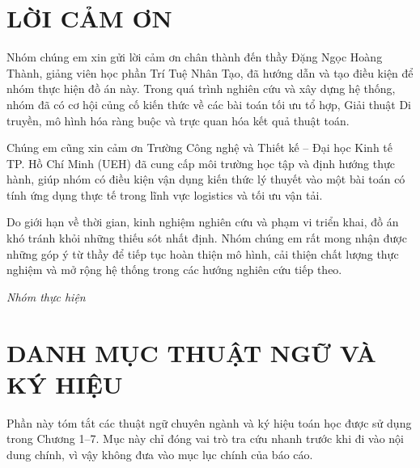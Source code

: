 \documentclass[12pt,a4paper]{article}
\numberwithin{figure}{subsection}
\numberwithin{table}{subsection}
\begin{document}
\section*{LỜI CẢM ƠN}
{}

Nhóm chúng em xin gửi lời cảm ơn chân thành đến thầy Đặng Ngọc Hoàng Thành, giảng viên học phần Trí Tuệ Nhân Tạo, đã hướng dẫn và tạo điều kiện để nhóm thực hiện đồ án này. Trong quá trình nghiên cứu và xây dựng hệ thống, nhóm đã có cơ hội củng cố kiến thức về các bài toán tối ưu tổ hợp, Giải thuật Di truyền, mô hình hóa ràng buộc và trực quan hóa kết quả thuật toán.

Chúng em cũng xin cảm ơn Trường Công nghệ và Thiết kế -- Đại học Kinh tế TP. Hồ Chí Minh (UEH) đã cung cấp môi trường học tập và định hướng thực hành, giúp nhóm có điều kiện vận dụng kiến thức lý thuyết vào một bài toán có tính ứng dụng thực tế trong lĩnh vực logistics và tối ưu vận tải.

Do giới hạn về thời gian, kinh nghiệm nghiên cứu và phạm vi triển khai, đồ án khó tránh khỏi những thiếu sót nhất định. Nhóm chúng em rất mong nhận được những góp ý từ thầy để tiếp tục hoàn thiện mô hình, cải thiện chất lượng thực nghiệm và mở rộng hệ thống trong các hướng nghiên cứu tiếp theo.

\begin{flushright}
\textit{Nhóm thực hiện}
\end{flushright}
\newpage
\thispagestyle{empty}
\section*{DANH MỤC THUẬT NGỮ VÀ KÝ HIỆU}
{}

Phần này tóm tắt các thuật ngữ chuyên ngành và ký hiệu toán học được sử dụng trong Chương 1--7. Mục này chỉ đóng vai trò tra cứu nhanh trước khi đi vào nội dung chính, vì vậy không đưa vào mục lục chính của báo cáo.
\end{document}
